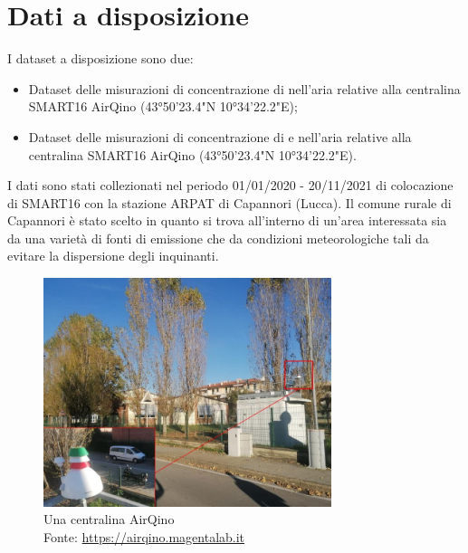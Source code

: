 \section{Dati a disposizione}\label{sec:dati}
I dataset a disposizione sono due:

\begin{itemize}
  \item Dataset delle misurazioni di concentrazione di  nell'aria relative alla centralina SMART16 AirQino (43°50'23.4"N 10°34'22.2"E);
  \item Dataset delle misurazioni di concentrazione di  e  nell'aria relative alla centralina SMART16 AirQino (43°50'23.4"N 10°34'22.2"E).
\end{itemize}

I dati sono stati collezionati nel periodo 01/01/2020 - 20/11/2021 di colocazione di SMART16 con la stazione ARPAT di Capannori (Lucca).
Il comune rurale di Capannori è stato scelto in quanto si trova all'interno di un'area interessata sia da una varietà di fonti di emissione che da condizioni meteorologiche tali da evitare la dispersione degli inquinanti.

\begin{figure}[H]
\centering
\captionsetup{justification=centering}
\includegraphics[width=0.75\textwidth,height=\textheight,keepaspectratio]{img/smart72.jpg}
\caption{Una centralina AirQino\\Fonte: \url{https://airqino.magentalab.it}}
\label{fig:smart72}
\end{figure}

